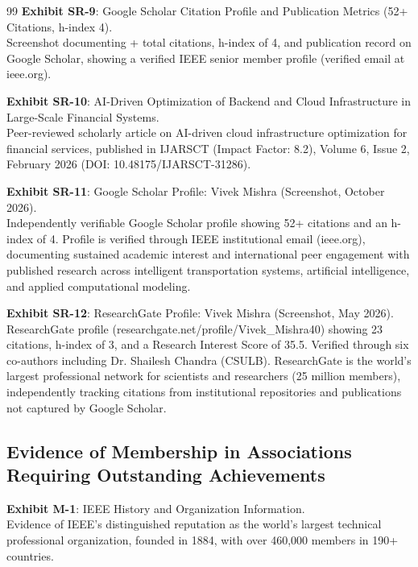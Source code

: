 \documentclass[11pt]{article}
\begin{document}
\begin{thebibliography}{99}
\textbf{Exhibit SR-9}: Google Scholar Citation Profile and Publication Metrics (52+ Citations, h-index 4).
\\Screenshot documenting + total citations, h-index of 4, and publication record on Google Scholar, showing a verified IEEE senior member profile (verified email at ieee.org).

\textbf{Exhibit SR-10}: AI-Driven Optimization of Backend and Cloud Infrastructure in Large-Scale Financial Systems.
\\Peer-reviewed scholarly article on AI-driven cloud infrastructure optimization for financial services, published in IJARSCT (Impact Factor: 8.2), Volume 6, Issue 2, February 2026 (DOI: 10.48175/IJARSCT-31286).

\textbf{Exhibit SR-11}: Google Scholar Profile: Vivek Mishra (Screenshot, October 2026).
\\Independently verifiable Google Scholar profile showing 52+ citations and an h-index of 4. Profile is verified through \drs IEEE institutional email (ieee.org), documenting sustained academic interest and international peer engagement with \drs published research across intelligent transportation systems, artificial intelligence, and applied computational modeling.

\textbf{Exhibit SR-12}: ResearchGate Profile: Vivek Mishra (Screenshot, May 2026).
\\ResearchGate profile (researchgate.net/profile/Vivek\_Mishra40) showing 23 citations, h-index of 3, and a Research Interest Score of 35.5. Verified through six co-authors including Dr. Shailesh Chandra (CSULB). ResearchGate is the world's largest professional network for scientists and researchers (25 million members), independently tracking citations from institutional repositories and publications not captured by Google Scholar.

\subsection*{Evidence of Membership in Associations Requiring Outstanding Achievements}

\textbf{Exhibit M-1}: IEEE History and Organization Information.
\\Evidence of IEEE's distinguished reputation as the world's largest technical professional organization, founded in 1884, with over 460,000 members in 190+ countries.


\end{thebibliography}
\end{document}
